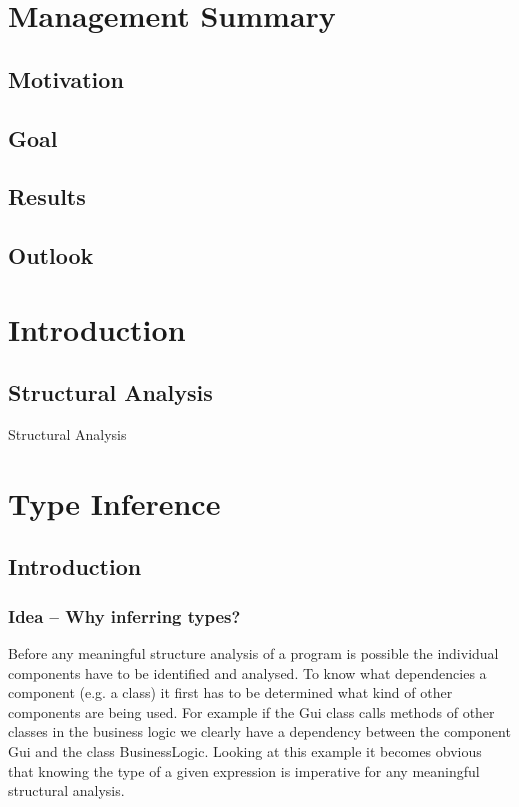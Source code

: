 \documentclass[12pt,halfparskip]{scrreprt}
\begin{document}
\chapter*{Management Summary}

\section*{Motivation}

\section*{Goal}

\section*{Results}

\section*{Outlook}


\newpage

\tableofcontents

\newpage
{}
\pagestyle{scrheadings}

\chapter{Introduction}

\section{Structural Analysis}

Structural Analysis

\chapter{Type Inference}

\section{Introduction}

\subsection{Idea – Why inferring types?}
Before any meaningful structure analysis of a program is possible the individual components have to be identified and analysed. To know what dependencies a component (e.g. a class) it first has to be determined what kind of other components are being used. For example if the Gui class calls methods of other classes in the business logic we clearly have a dependency between the component Gui and the class BusinessLogic. Looking at this example it becomes obvious that knowing the type of a given expression is imperative for any meaningful structural analysis.
\end{document}

